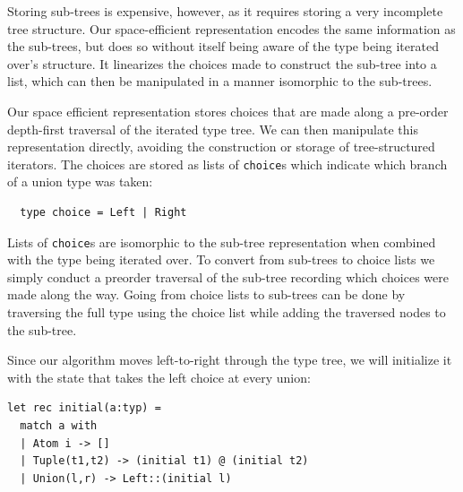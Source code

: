 \documentclass[a4paper,english]{lipics-v2019}
\begin{document}
Storing sub-trees is expensive, however, as it requires storing a very
incomplete tree structure. Our space-efficient representation encodes the
same information as the sub-trees, but does so without itself being aware of
the type being iterated over's structure. It linearizes the choices made to
construct the sub-tree into a list, which can then be manipulated in a
manner isomorphic to the sub-trees.

Our space efficient representation stores choices that are made along a
pre-order depth-first traversal of the iterated type tree. We can then
manipulate this representation directly, avoiding the construction or
storage of tree-structured iterators. The choices are stored as lists of
\verb|choice|s which indicate which branch of a union type was taken:

\begin{lstlisting}
  type choice = Left | Right
\end{lstlisting}


Lists of \verb|choice|s are isomorphic to the sub-tree representation when
combined with the type being iterated over. To convert from sub-trees  to
choice lists we simply conduct a preorder traversal of the sub-tree recording
which choices were made along the way. Going from choice lists to sub-trees can
be done by traversing the full type using the choice list while adding the traversed
nodes to the sub-tree.

Since our algorithm moves left-to-right through the type tree, we will
initialize it with the state that takes the left choice at every union:


\begin{lstlisting}
let rec initial(a:typ) = 
  match a with
  | Atom i -> []
  | Tuple(t1,t2) -> (initial t1) @ (initial t2)
  | Union(l,r) -> Left::(initial l)
\end{lstlisting}
\end{document}
